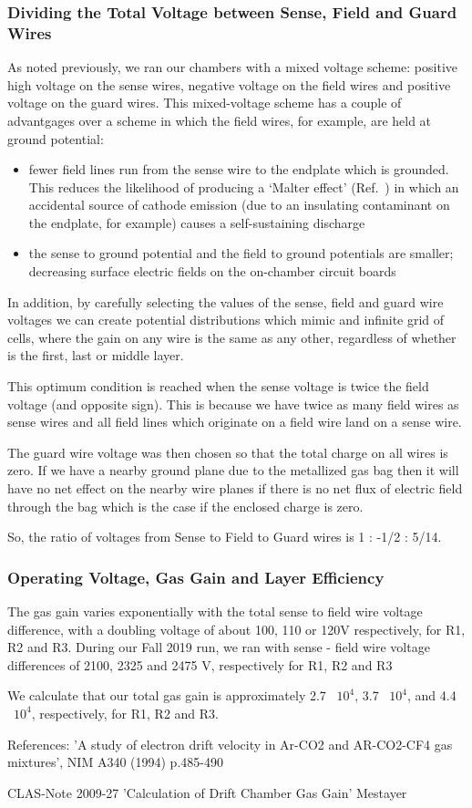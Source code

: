\subsubsection{Dividing the Total Voltage between Sense, Field and Guard Wires}
As noted previously, we ran our chambers with a mixed voltage scheme:
positive high voltage on the sense wires, negative voltage on the
field wires and positive voltage on the guard wires.
This mixed-voltage scheme has a couple of advantgages over a scheme in
which the field wires, for example, are held at ground potential:
\begin{itemize}
\item fewer field lines run from the sense wire to the endplate which
is grounded.  This reduces the likelihood of producing a `Malter effect'
(Ref.~\cite{Malter}) in which an accidental source of cathode emission
(due to an insulating contaminant on the endplate, for example) causes
a self-sustaining discharge
\item the sense to ground potential and the field to ground potentials 
are smaller; decreasing surface electric fields on the on-chamber
circuit boards
\end{itemize}

In addition, by carefully selecting the values of the sense, field and
guard wire voltages we can create potential distributions which mimic
and infinite grid of cells, where the gain on any wire is the same as
any other, regardless of whether is the first, last or middle layer.

This optimum condition is reached when the sense voltage is twice the
field voltage (and opposite sign).  This is because we have twice as many
field wires as sense wires and all field lines which originate on a
field wire land on a sense wire.  

The guard wire voltage was then chosen so that the total charge on all wires is zero.  
If we have a nearby ground plane due to the metallized gas bag then it will
have no net effect on the nearby wire planes if there is no net flux of
electric field through the bag which is the case if the enclosed charge
is zero.

So, the ratio of voltages from Sense to Field to Guard wires is 1 : -1/2 : 5/14.

\subsubsection{Operating Voltage, Gas Gain and Layer Efficiency}
The gas gain varies exponentially with the total sense to field wire voltage
difference, with a doubling voltage of about 100, 110 or 120V respectively, for
R1, R2 and R3.  During our Fall 2019 run, we ran with sense - field wire voltage
differences of 2100, 2325 and 2475 V, respectively for R1, R2 and R3

We calculate that our total gas gain is approximately 2.7 ~$10^4$, 3.7 ~$10^4$, and 4.4 ~$10^4$,  
respectively, for R1, R2 and R3.


References: 'A study of electron drift velocity in Ar-CO2 and AR-CO2-CF4 gas
mixtures', NIM A340 (1994) p.485-490

CLAS-Note 2009-27 'Calculation of Drift Chamber Gas Gain' Mestayer
